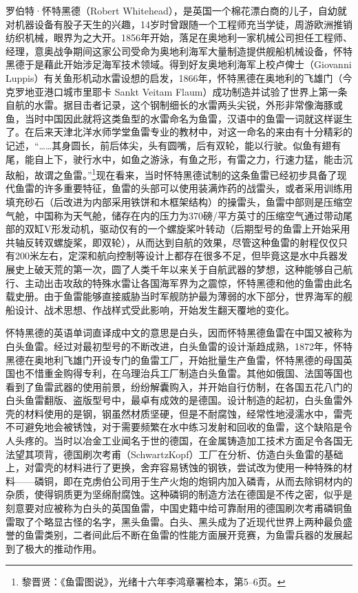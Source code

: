\documentclass[12pt,UTF8]{ctexbook}
\begin{document}
罗伯特·怀特黑德（Robert Whitehead），是英国一个棉花漂白商的儿子，自幼就对机器设备有股子天生的兴趣，14岁时曾跟随一个工程师充当学徒，周游欧洲推销纺织机械，眼界为之大开。1856年开始，落足在奥地利一家机械公司担任工程师、经理，意奥战争期间这家公司受命为奥地利海军大量制造提供舰船机械设备，怀特黑德于是藉此开始涉足海军技术领域。得到好友奥地利海军上校卢俾士（Giovanni Luppis）有关鱼形机动水雷设想的启发，1866年，怀特黑德在奥地利的飞雄门（今克罗地亚港口城市里耶卡 Sankt Veitam Flaum）成功制造并试验了世界上第一条自航的水雷。据目击者记录，这个钢制细长的水雷两头尖锐，外形非常像海豚或鱼，当时中国因此就将这类鱼型的水雷命名为鱼雷，汉语中的鱼雷一词就这样诞生了。在后来天津北洋水师学堂鱼雷专业的教材中，对这一命名的来由有十分精彩的记述，“……其身圆长，前后体尖，头有圆嘴，后有双轮，能以行驶。似鱼有翅有尾，能自上下，驶行水中，如鱼之游泳，有鱼之形，有雷之力，行速力猛，能击沉敌船，故谓之鱼雷。”\footnote{黎晋贤：《鱼雷图说》，光绪十六年李鸿章署检本，第5--6页。}现在看来，当时怀特黑德试制的这条鱼雷已经初步具备了现代鱼雷的许多重要特征，鱼雷的头部可以使用装满炸药的战雷头，或者采用训练用填充砂石（后改进为内部采用铁饼和木框架结构）的操雷头，鱼雷中部则是压缩空气舱，中国称为天气舱，储存在内的压力为370磅/平方英寸的压缩空气通过带动尾部的双缸V形发动机，驱动仅有的一个螺旋桨叶转动（后期型号的鱼雷上开始采用共轴反转双螺旋桨，即双轮），从而达到自航的效果，尽管这种鱼雷的射程仅仅只有200米左右，定深和航向控制等设计上都存在很多不足，但毕竟这是水中兵器发展史上破天荒的第一次，圆了人类千年以来关于自航武器的梦想，这种能够自己航行、主动出击攻敌的特殊水雷让各国海军界为之震惊，怀特黑德和他的鱼雷由此名载史册。由于鱼雷能够直接威胁当时军舰防护最为薄弱的水下部分，世界海军的舰船设计、战术思想、作战样式受此影响，开始发生翻天覆地的变化。

怀特黑德的英语单词直译成中文的意思是白头，因而怀特黑德鱼雷在中国又被称为白头鱼雷。经过对最初型号的不断改进，白头鱼雷的设计渐趋成熟，1872年，怀特黑德在奥地利飞雄门开设专门的鱼雷工厂，开始批量生产鱼雷，怀特黑德的母国英国也不惜重金购得专利，在乌理治兵工厂制造白头鱼雷。其他如俄国、法国等国也看到了鱼雷武器的使用前景，纷纷解囊购入，并开始自行仿制，在各国五花八门的白头鱼雷翻版、盗版型号中，最卓有成效的是德国。设计制造的起初，白头鱼雷外壳的材料使用的是钢，钢虽然材质坚硬，但是不耐腐蚀，经常性地浸濡水中，雷壳不可避免地会被锈蚀，对于需要频繁在水中练习发射和回收的鱼雷，这个缺陷是令人头疼的。当时以冶金工业闻名于世的德国，在金属铸造加工技术方面足令各国无法望其项背，德国刷次考甫（SchwartzKopf）工厂在分析、仿造白头鱼雷的基础上，对雷壳的材料进行了更换，舍弃容易锈蚀的钢铁，尝试改为使用一种特殊的材料——磷铜，即在克虏伯公司用于生产火炮的炮铜内加入磷青，从而去除铜材内的杂质，使得铜质更为坚绵耐腐蚀。这种磷铜的制造方法在德国是不传之密，似乎是刻意要对应被称为白头的英国鱼雷，中国史籍中给可靠耐用的德国刷次考甫磷铜鱼雷取了个略显古怪的名字，黑头鱼雷。白头、黑头成为了近现代世界上两种最负盛誉的鱼雷类别，二者间此后不断在鱼雷的性能方面展开竞赛，为鱼雷兵器的发展起到了极大的推动作用。
\end{document}
